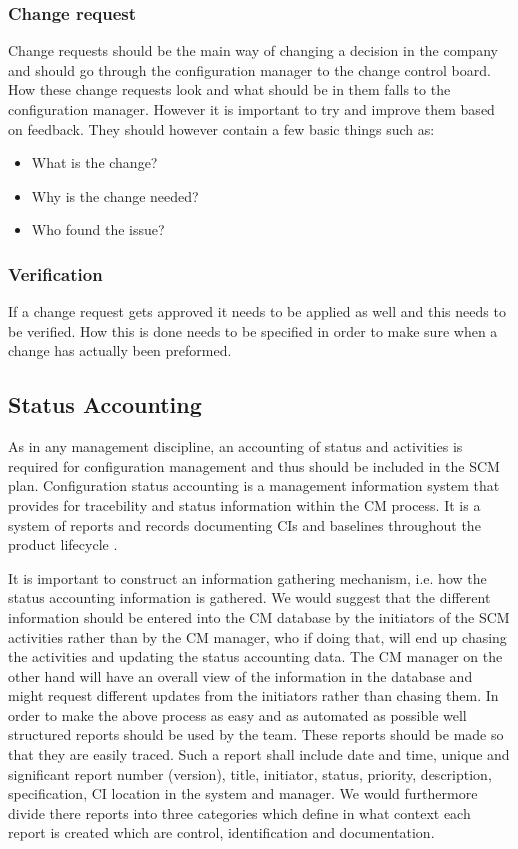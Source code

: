 \documentclass[a4paper]{article}
\begin{document}
\subsubsection{Change request}
Change requests should be the main way of changing a decision in the company and should go through the configuration manager to the change control board. How these change requests look and what should be in them falls to the configuration manager. However it is important to try and improve them based on feedback. They should however contain a few basic things such as:
\begin{itemize}
\item What is the change?
\item Why is the change needed?
\item Who found the issue?
\end{itemize}

\subsubsection{Verification}
If a change request gets approved it needs to be applied as well and this needs to be verified. How this is done needs to be specified in order to make sure when a change has actually been preformed.

\subsection{Status Accounting}

As in any management discipline, an accounting of status and activities is required for configuration management \cite{daniels} and thus should be included in the SCM plan. Configuration status accounting is a management information system that provides for tracebility and status information within the CM process. It is a system of reports and records documenting CIs and baselines throughout the product lifecycle \cite{daniels}. 

It is important to construct an information gathering mechanism, i.e. how the status accounting information is gathered. We would suggest that the different information should be entered into the CM database by the initiators of the SCM activities rather than by the CM manager, who if doing that, will end up chasing the activities and updating the status accounting data. The CM manager on the other hand will have an overall view of the information in the database and might request different updates from the initiators rather than chasing them. In order to make the above process as easy and as automated as possible well structured reports should be used by the team. These reports should be made so that they are easily traced. Such a report shall include date and time, unique and significant report number (version), title, initiator, status, priority, description, specification, CI location in the system and manager. We would furthermore divide there reports into three categories which define in what context each report is created which are control, identification and documentation.
\end{document}
